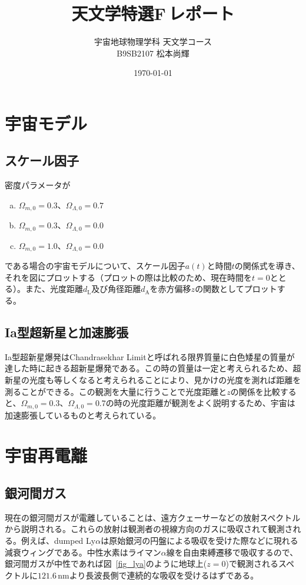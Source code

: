 \documentclass[a4paper,papersize,uplatex,dvipdfmx,10pt]{jsarticle}
\title{天文学特選F\,レポート}
\author{宇宙地球物理学科\,\,天文学コース\\B9SB2107\,\,松本尚輝}
\date{\today}
\begin{document}
\maketitle
\section{宇宙モデル}
\subsection{スケール因子}
密度パラメータが
\begin{enumerate}[(a)]
  \item $\Omega_{m,0}=0.3$、$\Omega_{\Lambda,0}=0.7$
  \item $\Omega_{m,0}=0.3$、$\Omega_{\Lambda,0}=0.0$
  \item $\Omega_{m,0}=1.0$、$\Omega_{\Lambda,0}=0.0$
\end{enumerate}
である場合の宇宙モデルについて、スケール因子$a(t)$と時間$t$の関係式を導き、それを図にプロットする（プロットの際は比較のため、現在時間を$t=0$ととる）。また、光度距離$d_{\mathrm{L}}$及び角径距離$d_{\mathrm{A}}$を赤方偏移$z$の関数としてプロットする。



\subsection{Ia型超新星と加速膨張}
Ia型超新星爆発はChandrasekhar Limitと呼ばれる限界質量に白色矮星の質量が達した時に起きる超新星爆発である。この時の質量は一定と考えられるため、超新星の光度も等しくなると考えられることにより、見かけの光度を測れば距離を測ることができる。この観測を大量に行うことで光度距離と$z$の関係を比較すると、$\Omega_{m,0}=0.3$、$\Omega_{\Lambda,0}=0.7$の時の光度距離が観測をよく説明するため、宇宙は加速膨張しているものと考えられている。

\section{宇宙再電離}
\subsection{銀河間ガス}
現在の銀河間ガスが電離していることは、遠方クェーサーなどの放射スペクトルから説明される。これらの放射は観測者の視線方向のガスに吸収されて観測される。例えば、dumped Ly$\alpha$は原始銀河の円盤による吸収を受けた際などに現れる減衰ウィングである。中性水素はライマン$\alpha$線を自由束縛遷移で吸収するので、銀河間ガスが中性であれば図~\ref{fig_lya}のように地球上($z=0$)で観測されるスペクトルに$121.6\,\mathrm{nm}$より長波長側で連続的な吸収を受けるはずである。
\end{document}
